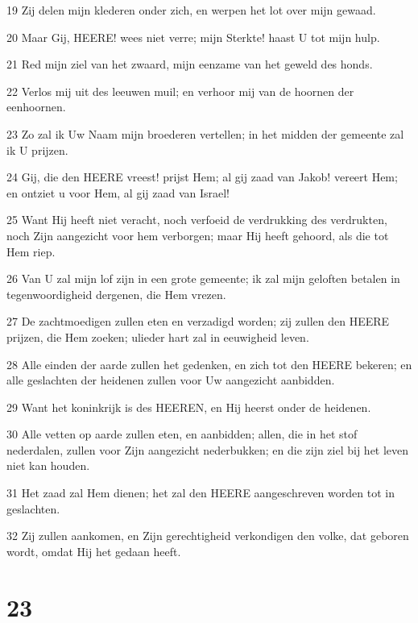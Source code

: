 \par 19 Zij delen mijn klederen onder zich, en werpen het lot over mijn gewaad.
\par 20 Maar Gij, HEERE! wees niet verre; mijn Sterkte! haast U tot mijn hulp.
\par 21 Red mijn ziel van het zwaard, mijn eenzame van het geweld des honds.
\par 22 Verlos mij uit des leeuwen muil; en verhoor mij van de hoornen der eenhoornen.
\par 23 Zo zal ik Uw Naam mijn broederen vertellen; in het midden der gemeente zal ik U prijzen.
\par 24 Gij, die den HEERE vreest! prijst Hem; al gij zaad van Jakob! vereert Hem; en ontziet u voor Hem, al gij zaad van Israel!
\par 25 Want Hij heeft niet veracht, noch verfoeid de verdrukking des verdrukten, noch Zijn aangezicht voor hem verborgen; maar Hij heeft gehoord, als die tot Hem riep.
\par 26 Van U zal mijn lof zijn in een grote gemeente; ik zal mijn geloften betalen in tegenwoordigheid dergenen, die Hem vrezen.
\par 27 De zachtmoedigen zullen eten en verzadigd worden; zij zullen den HEERE prijzen, die Hem zoeken; ulieder hart zal in eeuwigheid leven.
\par 28 Alle einden der aarde zullen het gedenken, en zich tot den HEERE bekeren; en alle geslachten der heidenen zullen voor Uw aangezicht aanbidden.
\par 29 Want het koninkrijk is des HEEREN, en Hij heerst onder de heidenen.
\par 30 Alle vetten op aarde zullen eten, en aanbidden; allen, die in het stof nederdalen, zullen voor Zijn aangezicht nederbukken; en die zijn ziel bij het leven niet kan houden.
\par 31 Het zaad zal Hem dienen; het zal den HEERE aangeschreven worden tot in geslachten.
\par 32 Zij zullen aankomen, en Zijn gerechtigheid verkondigen den volke, dat geboren wordt, omdat Hij het gedaan heeft.

\chapter{23}

